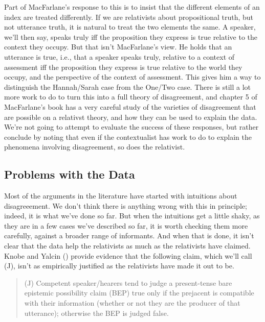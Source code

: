 \documentclass[
  11pt,
  letterpaper,
  DIV=11,
  numbers=noendperiod,
  twoside]{scrartcl}
\begin{document}
Part of MacFarlane's response to this is to insist that the different
elements of an index are treated differently. If we are relativists
about propositional truth, but not utterance truth, it is natural to
treat the two elements the same. A speaker, we'll then say, speaks truly
iff the proposition they express is true relative to the context they
occupy. But that isn't MacFarlane's view. He holds that an utterance is
true, i.e., that a speaker speaks truly, relative to a context of
assessment iff the proposition they express is true relative to the
world they occupy, and the perspective of the context of assessment.
This gives him a way to distinguish the Hannah/Sarah case from the
One/Two case. There is still a lot more work to do to turn this into a
full theory of disagreement, and chapter 5 of MacFarlane's book has a
very careful study of the varieties of disagreement that are possible on
a relativst theory, and how they can be used to explain the data. We're
not going to attempt to evaluate the success of these responses, but
rather conclude by noting that even if the contextualist has work to do
to explain the phenomena involving disagreement, so does the relativist.

\subsection{Problems with the Data}\label{problemswiththedata}

Most of the arguments in the literature have started with intuitions
about disagreeement. We don't think there is anything wrong with this in
principle; indeed, it is what we've done so far. But when the intuitions
get a little shaky, as they are in a few cases we've described so far,
it is worth checking them more carefully, against a broader range of
informants. And when that is done, it isn't clear that the data help the
relativists as much as the relativists have claimed. Knobe and Yalcin
() provide evidence that the
following claim, which we'll call (J), isn't as empirically justified as
the relativists have made it out to be.

\begin{quote}
(J) Competent speaker/hearers tend to judge a present-tense bare
epistemic possibility claim (BEP) true only if the prejacent is
compatible with their information (whether or not they are the producer
of that utterance); otherwise the BEP is judged false.
\end{quote}
\end{document}
